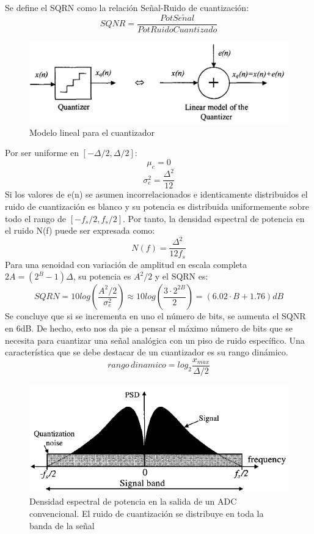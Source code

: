 \documentclass[assd_tp3_main.tex]{subfiles}
\begin{document}
Se define el SQRN como la relación Señal-Ruido de cuantización:
\[ SQNR= \frac{PotSe\tilde{n}al}{PotRuidoCuantizado}\]

\begin{figure}[H]
\centering
\includegraphics[width=0.52\linewidth]{images/ej4/cuantmodel.png}
\caption{Modelo lineal para el cuantizador}
\label{fig:cuantmodel}
\end{figure}


Por ser uniforme en $[-\Delta/2,\Delta/2]$:\\
\[ \mu_e = 0 \]
\[ \sigma_e^2 = \frac{\Delta^2}{12} \]
Si los valores de e(n) se asumen incorrelacionados e identicamente distribuidos el ruido de cuantización es blanco y su potencia es distribuida uniformemente sobre todo el rango de $[-f_s/2,f_s/2]$. Por tanto, la densidad espectral de potencia en el ruido N(f) puede ser expresada como:
\[ N(f)=\frac{\Delta^2}{12f_s} \]
Para una senoidad con variación de amplitud en escala completa\\ 
$2A =(2^B-1)\Delta$, su potencia es $A^2/2$ y el SQRN es:\\
\[ SQRN=10log\left( \frac{A^2/2}{\sigma_e^2} \right)\approx10log\left(\frac{3\cdot2^{2B}}{2}\right)=(6.02 \cdot B+1.76)dB \]
Se concluye que si se incrementa en uno el número de bits, se aumenta el SQNR en 6dB.
De hecho, esto nos da pie a pensar el máximo número de bits que se necesita para cuantizar una señal analógica con un piso de ruido específico.
Una característica que se debe destacar de un cuantizador es su rango dinámico. 
\[ rango\,dinamico=log_2\frac{x_{max}}{\Delta/2}\]

\begin{figure}[H]
\centering
\includegraphics[width=0.52\linewidth]{images/ej4/ruido_desplazado.png}
\caption{Densidad espectral de potencia en la salida de un ADC convencional. El ruido de cuantización se distribuye en toda la banda de la señal}
\label{fig:PSD}
\end{figure}
\end{document}
